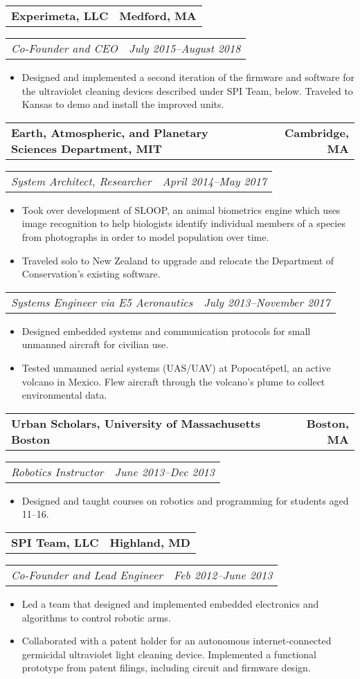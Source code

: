 \documentclass[10pt,letterpaper]{article}
\newcommand{\headerrow}[2]{%
    \begin{tabularx}{\linewidth}{Xr}
	    #1 & #2 \\
    \end{tabularx}
}
\begin{document}
    \headerrow{\textbf{Experimeta, LLC}}{\textbf{Medford, MA}}
    \headerrow{\textit{Co-Founder and CEO}}{\textit{July 2015--August 2018}}
    \begin{itemize}[label=--]
        \item Designed and implemented a second iteration of the firmware and
            software for the ultraviolet cleaning devices described under SPI
            Team, below. Traveled to Kansas to demo and install the improved units.
    \end{itemize}

    \headerrow{\textbf{Earth, Atmospheric, and Planetary Sciences Department, MIT}}
        {\textbf{Cambridge, MA}}
    \headerrow{\textit{System Architect, Researcher}}{\textit{April 2014--May 2017}}
    \begin{itemize}[label=--]
        \item Took over development of SLOOP, an animal biometrics engine which uses image recognition to help
          biologists identify individual members of a species from photographs in order to model population over time.

        \item Traveled solo to New Zealand to upgrade and relocate the Department of Conservation's existing software.
    \end{itemize}

    \headerrow{\textit{Systems Engineer via E5 Aeronautics}}
        {\textit{July 2013--November 2017}}
    \begin{itemize}[label=--]
        \item Designed embedded systems and communication protocols for small unmanned aircraft for civilian use.

        \item Tested unmanned aerial systems (UAS/UAV) at Popocatépetl, an active
            volcano in Mexico. Flew aircraft through the volcano's plume to collect environmental data.
    \end{itemize}

    \headerrow{\textbf{Urban Scholars, University of Massachusetts Boston}}
		{\textbf{Boston, MA}}
	\headerrow{\textit{Robotics Instructor}}{\textit{June 2013--Dec 2013}}
    \begin{itemize}[label=--]
        \item Designed and taught courses on robotics and programming for students aged 11--16.
	\end{itemize}

	\headerrow{\textbf{SPI Team, LLC}}{\textbf{Highland, MD}}
	\headerrow{\textit{Co-Founder and Lead Engineer}}
		{\textit{Feb 2012--June 2013}}
    \begin{itemize}[label=--]
        \item Led a team that designed and implemented embedded electronics and algorithms to control robotic arms.

        \item Collaborated with a patent holder for an autonomous
          internet-connected germicidal ultraviolet light cleaning device. Implemented a functional prototype from
          patent filings, including circuit and firmware design.
	\end{itemize}
\end{document}
